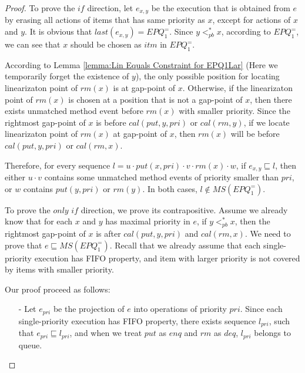 \begin {proof}

To prove the $\textit{if}$ direction, let $e_{x,y}$ be the execution that is obtained from $e$ by erasing all actions of items that has same priority as $x$, except for actions of $x$ and $y$. It is obvious that $\textit{last}(e_{x,y}) = \textit{EPQ}_1^{=}$. Since $y <_{\textit{pb}}^* x$, according to $\textit{EPQ}_1^{=}$, we can see that $x$ should be chosen as $\textit{itm}$ in $\textit{EPQ}_1^{=}$.

According to Lemma \ref{lemma:Lin Equals Constraint for EPQ1Lar} (Here we temporarily forget the existence of $y$), the only possible position for locating linearizaton point of $\textit{rm}(x)$ is at gap-point of $x$. Otherwise, if the linearizaton point of $\textit{rm}(x)$ is chosen at a position that is not a gap-point of $x$, then there exists unmatched method event before $\textit{rm}(x)$ with smaller priority. Since the rightmost gap-point of $x$ is before $\textit{cal}(\textit{put},y,\textit{pri})$ or $\textit{cal}(\textit{rm},y)$, if we locate linearizaton point of $\textit{rm}(x)$ at gap-point of $x$, then $\textit{rm}(x)$ will be before $\textit{cal}(\textit{put},y,\textit{pri})$ or $\textit{cal}(\textit{rm},x)$.

Therefore, for every sequence $l = u \cdot \textit{put}(x,\textit{pri}) \cdot v \cdot \textit{rm}(x) \cdot w$, if $e_{x,y} \sqsubseteq l$, then either $u \cdot v$ contains some unmatched method events of priority smaller than $\textit{pri}$, or $w$ contains $\textit{put}(y,\textit{pri})$ or $\textit{rm}(y)$. In both cases, $l \notin \textit{MS}(\textit{EPQ}_1^{=})$.

To prove the $\textit{only if}$ direction, we prove its contrapositive. Assume we already know that for each $x$ and $y$ has maximal priority in $e$, if $y <_{\textit{pb}}^* x$, then the rightmost gap-point of $x$ is after $\textit{cal}(\textit{put},y,\textit{pri})$ and $\textit{cal}(\textit{rm},x)$. We need to prove that $e \sqsubseteq \textit{MS}(\textit{EPQ}_1^{=})$. Recall that we already assume that each single-priority execution has FIFO property, and item with larger priority is not covered by items with smaller priority.

Our proof proceed as follows:

\begin{itemize}
\setlength{\itemsep}{0.5pt}
\item[-] Let $e_{\textit{pri}}$ be the projection of $e$ into operations of priority $\textit{pri}$. Since each single-priority execution has FIFO property, there exists sequence $l_{\textit{pri}}$, such that $e_{\textit{pri}} \sqsubseteq l_{\textit{pri}}$, and when we treat $\textit{put}$ as $\textit{enq}$ and $\textit{rm}$ as $\textit{deq}$, $l_{\textit{pri}}$ belongs to queue.


\end{itemize}
\end{proof}
